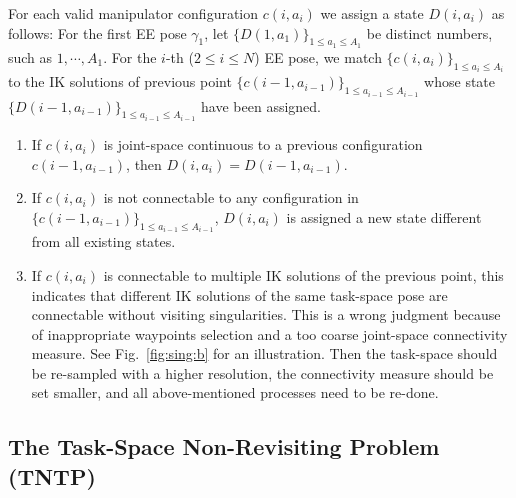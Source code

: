 \documentclass[letterpaper, 10 pt, conference]{ieeeconf}  %
\begin{document}
For each valid manipulator configuration $c(i, a_i)$ we assign a state $D(i, a_i)$ as follows: 
For the first EE pose $\gamma_1$, let $\{D(1, a_1)\}_{1\leq a_1\leq A_1}$ be distinct numbers, such as $1, \cdots, A_1$. 
For the $i$-th ($2\leq i\leq N$) EE pose, we match $\{c(i, a_i)\}_{1\leq a_i\leq A_i}$ to the IK solutions of previous point $\{c(i-1, a_{i-1})\}_{1\leq a_{i-1}\leq A_{i-1}}$ whose state $\{D(i-1, a_{i-1})\}_{1\leq a_{i-1}\leq A_{i-1}}$ have been assigned. 
\begin{enumerate}
\item If $c(i, a_i)$ is joint-space continuous to a previous configuration $c(i-1, a_{i-1})$, then $D(i, a_i) = D(i-1, a_{i-1})$.
\item If $c(i, a_i)$ is not connectable to any configuration in $\{c(i-1, a_{i-1})\}_{1\leq a_{i-1}\leq A_{i-1}}$,  $D(i, a_i)$ is assigned a new state different from all existing states. 
\item If $c(i, a_i)$ is connectable to multiple IK solutions of the previous point, this indicates that different IK solutions of the same task-space pose are connectable without visiting singularities. This is a wrong judgment because of inappropriate waypoints selection and a too coarse joint-space connectivity measure. See Fig.~\ref{fig:sing:b} for an illustration. Then the task-space should be re-sampled with a higher resolution, the connectivity measure should be set smaller, and all above-mentioned processes need to be re-done. 
\end{enumerate}


\subsection{The Task-Space Non-Revisiting Problem (TNTP)}
\end{document}
